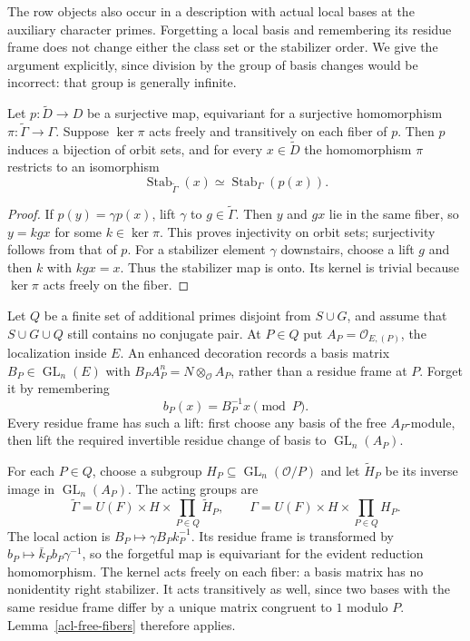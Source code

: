 The row objects also occur in a description with actual local
bases at the auxiliary character primes. Forgetting a local basis
and remembering its residue frame does not change either the
class set or the stabilizer order. We give the argument explicitly,
since division by the group of basis changes would be incorrect:
that group is generally infinite.

\begin{lemma}\label{acl-free-fibers}
Let $p:\widetilde D\to D$ be a surjective map, equivariant for
a surjective homomorphism $\pi:\widetilde\Gamma\to\Gamma$.
Suppose $\ker\pi$ acts freely and transitively on each fiber
of $p$. Then $p$ induces a bijection of orbit sets, and for
every $x\in\widetilde D$ the homomorphism $\pi$ restricts
to an isomorphism
\[
           \operatorname{Stab}_{\widetilde\Gamma}(x)
                    \simeq\operatorname{Stab}_\Gamma(p(x)).
\]
\end{lemma}
\begin{proof}
If $p(y)=\gamma p(x)$, lift $\gamma$ to $g\in\widetilde\Gamma$.
Then $y$ and $gx$ lie in the same fiber, so $y=kgx$ for
some $k\in\ker\pi$. This proves injectivity on orbit sets;
surjectivity follows from that of $p$. For a stabilizer
element $\gamma$ downstairs, choose a lift $g$ and then $k$
with $kgx=x$. Thus the stabilizer map is onto. Its kernel
is trivial because $\ker\pi$ acts freely on the fiber.
\end{proof}

Let $Q$ be a finite set of additional primes disjoint from
$S\cup G$, and assume that $S\cup G\cup Q$ still contains
no conjugate pair. At $P\in Q$ put
$A_P=\mathcal O_{E,(P)}$, the localization inside $E$.
An enhanced decoration records a basis matrix
$B_P\in\operatorname{GL}_n(E)$ with
$B_PA_P^n=N\otimes_{\mathcal O}A_P$, rather than a residue
frame at $P$. Forget it by remembering
\[
                            b_P(x)=B_P^{-1}x\pmod P.
\]
Every residue frame has such a lift: first choose any basis
of the free $A_P$-module, then lift the required invertible
residue change of basis to $\operatorname{GL}_n(A_P)$.

For each $P\in Q$, choose a subgroup
$H_P\subseteq\operatorname{GL}_n(\mathcal O/P)$ and let
$\widetilde H_P$ be its inverse image in
$\operatorname{GL}_n(A_P)$. The acting groups are
\[
 \widetilde\Gamma=U(F)\times H\times\prod_{P\in Q}\widetilde H_P,
 \qquad
 \Gamma=U(F)\times H\times\prod_{P\in Q}H_P.
\]
The local action is $B_P\mapsto\gamma B_Pk_P^{-1}$.
Its residue frame is transformed by
$b_P\mapsto\bar k_Pb_P\gamma^{-1}$, so the forgetful map
is equivariant for the evident reduction homomorphism.
The kernel acts freely on each fiber: a basis matrix has no
nonidentity right stabilizer. It acts transitively as well,
since two bases with the same residue frame differ by a
unique matrix congruent to $1$ modulo $P$.
Lemma~\ref{acl-free-fibers} therefore applies.


